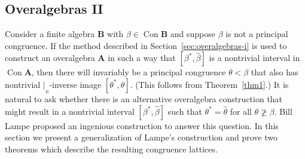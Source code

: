 \documentclass{au}
\numberwithin{equation}{section}
\theoremstyle{plain}
\theoremstyle{definition}
\newcommand{\<}{\ensuremath{\langle}}
\renewcommand{\>}{\ensuremath{\rangle}}
\newcommand{\bA}{\ensuremath{\mathbf{A}}}
\newcommand{\bB}{\ensuremath{\mathbf{B}}}
\DeclareMathOperator{\Con}{Con}
\newcommand{\htheta}{\ensuremath{\widehat{\theta}}}
\newcommand{\resB}{\ensuremath{|_{_B}}}
\newcommand{\hbeta}{\ensuremath{\widehat{\beta}}}
\begin{document}
\subsection{Overalgebras II}
\label{sec:overalgebras-ii}
Consider a finite algebra $\bB$ with $\beta\in \Con \bB$ and suppose $\beta$ is
not a principal congruence.
If the method described in Section~\ref{sec:overalgebras-i} is used to construct
an overalgebra $\bA$ in such a way that $[\beta^*, \hbeta]$ is a nontrivial
interval in $\Con\bA$, then there will invariably
be a principal congruence $\theta < \beta$ that also has nontrivial $\resB$-inverse
image  $[\theta^*, \htheta]$.
(This follows from Theorem~\ref{thm1}.)
It is natural to ask whether there
is an alternative overalgebra construction that might result in a
nontrivial interval $[\beta^*, \hbeta]$ such that $\theta^* =  \htheta$ for
all $\theta \ngeq \beta$.
Bill Lampe proposed an ingenious construction to answer this question.
In this section we present a generalization of Lampe's construction
and prove two theorems which describe the resulting congruence lattices.
\end{document}
